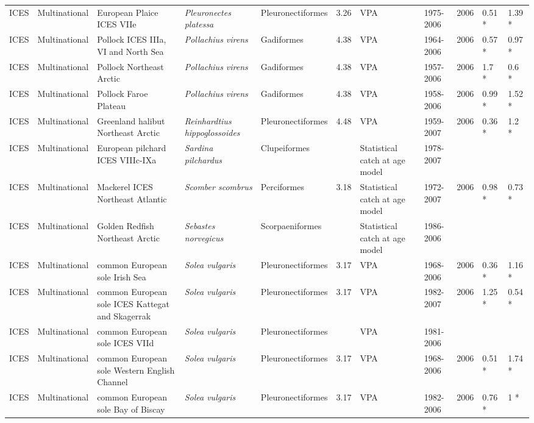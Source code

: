 \begin{longtable}{p{1.5cm}p{1.5cm}p{3cm}p{3cm}p{2.5cm}p{0.9cm}p{1.4cm}p{0.9cm}p{0.9cm}p{0.9cm}p{1cm}}
  ICES & Multinational & European Plaice ICES VIIe & \textit{Pleuronectes platessa} & Pleuronectiformes & 3.26 & VPA & 1975-2006 & 2006 & 0.51 * & 1.39 * \\ 
  ICES & Multinational & Pollock ICES IIIa, VI and North Sea & \textit{Pollachius virens} & Gadiformes & 4.38 & VPA & 1964-2006 & 2006 & 0.57 * & 0.97 * \\ 
  ICES & Multinational & Pollock Northeast Arctic & \textit{Pollachius virens} & Gadiformes & 4.38 & VPA & 1957-2006 & 2006 & 1.7 * & 0.6 * \\ 
  ICES & Multinational & Pollock Faroe Plateau & \textit{Pollachius virens} & Gadiformes & 4.38 & VPA & 1958-2006 & 2006 & 0.99 * & 1.52 * \\ 
  ICES & Multinational & Greenland halibut Northeast Arctic & \textit{Reinhardtius hippoglossoides} & Pleuronectiformes & 4.48 & VPA & 1959-2007 & 2006 & 0.36 * & 1.2 * \\ 
  ICES & Multinational & European pilchard ICES VIIIc-IXa & \textit{Sardina pilchardus} & Clupeiformes &  & Statistical catch at age model & 1978-2007 &  &  &  \\ 
  ICES & Multinational & Mackerel ICES Northeast Atlantic & \textit{Scomber scombrus} & Perciformes & 3.18 & Statistical catch at age model & 1972-2007 & 2006 & 0.98 * & 0.73 * \\ 
  ICES & Multinational & Golden Redfish Northeast Arctic & \textit{Sebastes norvegicus} & Scorpaeniformes &  & Statistical catch at age model & 1986-2006 &  &  &  \\ 
  ICES & Multinational & common European sole Irish Sea & \textit{Solea vulgaris} & Pleuronectiformes & 3.17 & VPA & 1968-2006 & 2006 & 0.36 * & 1.16 * \\ 
  ICES & Multinational & common European sole ICES Kattegat and Skagerrak & \textit{Solea vulgaris} & Pleuronectiformes & 3.17 & VPA & 1982-2007 & 2006 & 1.25 * & 0.54 * \\ 
  ICES & Multinational & common European sole ICES VIId & \textit{Solea vulgaris} & Pleuronectiformes &  & VPA & 1981-2006 &  &  &  \\ 
  ICES & Multinational & common European sole Western English Channel & \textit{Solea vulgaris} & Pleuronectiformes & 3.17 & VPA & 1968-2006 & 2006 & 0.51 * & 1.74 * \\ 
  ICES & Multinational & common European sole Bay of Biscay & \textit{Solea vulgaris} & Pleuronectiformes & 3.17 & VPA & 1982-2006 & 2006 & 0.76 * & 1 * \\ 

\end{longtable}
